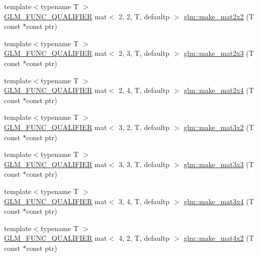 \begin{DoxyCompactItemize}
\item 
{\footnotesize template$<$typename T $>$ }\\\mbox{\hyperlink{setup_8hpp_a33fdea6f91c5f834105f7415e2a64407}{G\+L\+M\+\_\+\+F\+U\+N\+C\+\_\+\+Q\+U\+A\+L\+I\+F\+I\+ER}} mat$<$ 2, 2, T, defaultp $>$ \mbox{\hyperlink{group__gtc__type__ptr_gae49e1c7bcd5abec74d1c34155031f663}{glm\+::make\+\_\+mat2x2}} (T const $\ast$const ptr)
\item 
{\footnotesize template$<$typename T $>$ }\\\mbox{\hyperlink{setup_8hpp_a33fdea6f91c5f834105f7415e2a64407}{G\+L\+M\+\_\+\+F\+U\+N\+C\+\_\+\+Q\+U\+A\+L\+I\+F\+I\+ER}} mat$<$ 2, 3, T, defaultp $>$ \mbox{\hyperlink{group__gtc__type__ptr_ga21982104164789cf8985483aaefc25e8}{glm\+::make\+\_\+mat2x3}} (T const $\ast$const ptr)
\item 
{\footnotesize template$<$typename T $>$ }\\\mbox{\hyperlink{setup_8hpp_a33fdea6f91c5f834105f7415e2a64407}{G\+L\+M\+\_\+\+F\+U\+N\+C\+\_\+\+Q\+U\+A\+L\+I\+F\+I\+ER}} mat$<$ 2, 4, T, defaultp $>$ \mbox{\hyperlink{group__gtc__type__ptr_ga078b862c90b0e9a79ed43a58997d8388}{glm\+::make\+\_\+mat2x4}} (T const $\ast$const ptr)
\item 
{\footnotesize template$<$typename T $>$ }\\\mbox{\hyperlink{setup_8hpp_a33fdea6f91c5f834105f7415e2a64407}{G\+L\+M\+\_\+\+F\+U\+N\+C\+\_\+\+Q\+U\+A\+L\+I\+F\+I\+ER}} mat$<$ 3, 2, T, defaultp $>$ \mbox{\hyperlink{group__gtc__type__ptr_ga27a24e121dc39e6857620e0f85b6e1a8}{glm\+::make\+\_\+mat3x2}} (T const $\ast$const ptr)
\item 
{\footnotesize template$<$typename T $>$ }\\\mbox{\hyperlink{setup_8hpp_a33fdea6f91c5f834105f7415e2a64407}{G\+L\+M\+\_\+\+F\+U\+N\+C\+\_\+\+Q\+U\+A\+L\+I\+F\+I\+ER}} mat$<$ 3, 3, T, defaultp $>$ \mbox{\hyperlink{group__gtc__type__ptr_gaf2e8337b15c3362aaeb6e5849e1c0536}{glm\+::make\+\_\+mat3x3}} (T const $\ast$const ptr)
\item 
{\footnotesize template$<$typename T $>$ }\\\mbox{\hyperlink{setup_8hpp_a33fdea6f91c5f834105f7415e2a64407}{G\+L\+M\+\_\+\+F\+U\+N\+C\+\_\+\+Q\+U\+A\+L\+I\+F\+I\+ER}} mat$<$ 3, 4, T, defaultp $>$ \mbox{\hyperlink{group__gtc__type__ptr_ga05dd66232aedb993e3b8e7b35eaf932b}{glm\+::make\+\_\+mat3x4}} (T const $\ast$const ptr)
\item 
{\footnotesize template$<$typename T $>$ }\\\mbox{\hyperlink{setup_8hpp_a33fdea6f91c5f834105f7415e2a64407}{G\+L\+M\+\_\+\+F\+U\+N\+C\+\_\+\+Q\+U\+A\+L\+I\+F\+I\+ER}} mat$<$ 4, 2, T, defaultp $>$ \mbox{\hyperlink{group__gtc__type__ptr_ga8b34c9b25bf3310d8ff9c828c7e2d97c}{glm\+::make\+\_\+mat4x2}} (T const $\ast$const ptr)

\end{DoxyCompactItemize}
